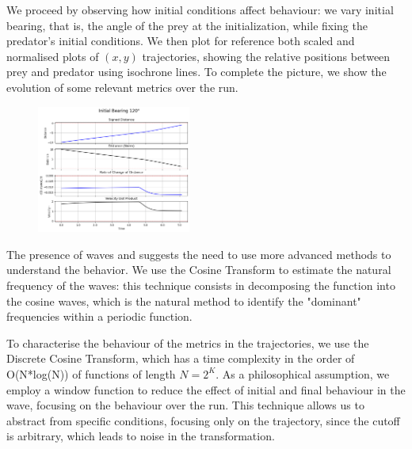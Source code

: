 \documentclass[10pt, twocolumn]{article}
\begin{document}
        We proceed by observing how initial conditions affect behaviour: we vary initial bearing, that is, the angle of the prey at the initialization, while fixing the predator's initial conditions. We then plot for reference both scaled and normalised plots of $(x,y)$ trajectories, showing the relative positions between prey and predator using isochrone lines. To complete the picture, we show the evolution of some relevant metrics over the run.

        \begin{figure}[H]
          \centering
          \includegraphics[width=0.45\textwidth]{figures/initial_bearing_120.png}
          \label{fig:bear120}
        \end{figure}

        The presence of waves and suggests the need to use more advanced methods to understand the behavior. We use the Cosine Transform to estimate the natural frequency of the waves: this technique consists in decomposing the function into the cosine waves, which is the natural method to identify the "dominant" frequencies within a periodic function.

        To characterise the behaviour of the metrics in the trajectories, we use the Discrete Cosine Transform, which has a time complexity in the order of O(N*log(N)) of functions of length $N = 2^K$. As a philosophical assumption, we employ a window function to reduce the effect of initial and final behaviour in the wave, focusing on the behaviour over the run. This technique allows us to abstract from specific conditions, focusing only on the trajectory, since the cutoff is arbitrary, which leads to noise in the transformation.
\end{document}

